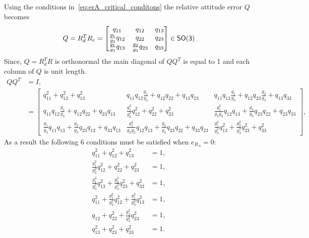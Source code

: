 Using the conditions in~\cref{eq:erA_critical_conditons} the relative attitude error \( Q \) becomes
\begin{align}\label{eq:relative_attitude_error}
    Q = R_d^T R_e =
    \begin{bmatrix} 
        q_{11} & q_{12} & q_{13} \\ 
        \frac{g_1}{g_2} q_{12} & q_{22} & q_{23} \\
        \frac{g_1}{g_3} q_{13} & \frac{g_2}{g_3} q_{23} & q_{33}
    \end{bmatrix}
    \in \mathsf{SO(3)}
\end{align}
Since, \( Q = R_d^T R \) is orthonormal the main diagonal of \( QQ^T \) is equal to \num{1} and each column of \( Q \) is unit length.
\begin{align*}
    Q Q^T &= I, \\
          &= \begin{bmatrix}
            q_{11}^2 + q_{12}^2 + q_{13}^2 & q_{11}q_{12}\frac{g_1}{g_2} + q_{12}q_{22} + q_{13}q_{23} & q_{11}q_{13}\frac{g_1}{g_3} + q_{12}q_{23}\frac{g_2}{g_3} + q_{13}q_{33} \\
            q_{11}q_{12}\frac{g_1}{g_2}  + q_{12}q_{22} + q_{23}q_{13} & \frac{g_1^2}{g_2^2}q_{12}^2 + q_{22}^2 + q_{23}^2 & \frac{g_1^2}{g_2g_3} q_{12}q_{13} + \frac{g_2}{g_3}q_{23}q_{22} + q_{23}q_{33} \\
            \frac{g_1}{g_3} q_{11}q_{13} + \frac{g_2}{g_3}q_{23}q_{12} + q_{33}q_{13} & \frac{g_1^2}{g_3 g_2} q_{12}q_{13} + \frac{g_2}{g_3} q_{23}q_{22} + q_{33} q_{23} & \frac{g_1^2}{g_3^2}q_{13}^2 + \frac{g_2^2}{g_3^2}q_{23}^2 + q_{33}^2
\end{bmatrix} , 
\end{align*}
As a result the following \num{6} conditions must be satisfied when \( e_{R_A} = 0 \):
\begin{align}
    q_{11}^2 + q_{12}^2 + q_{13}^2 &= 1,\label{eq:orthogonal_1} \\
    \frac{g_1^2}{g_2^2}q_{12}^2 + q_{22}^2 + q_{23}^2 &= 1, \label{eq:orthogonal_2}\\
    \frac{g_1^2}{g_3^2}q_{13}^2 + \frac{g_2^2}{g_3^2}q_{23}^2 + q_{33}^2 &= 1, \label{eq:orthogonal_3}\\
    q_{11}^2 + \frac{g_1^2}{g_2^2}q_{12}^2 + \frac{g_1^2}{g_3^2}q_{13}^2 &= 1, \label{eq:unit_norm_1}\\
    q_{12} + q_{22}^2 + \frac{g_2^2}{g_3^2}q_{23}^2 &= 1, \label{eq:unit_norm_2}\\
    q_{13}^2 + q_{23}^2 + q_{33}^2 &= 1.\label{eq:unit_norm_3}
\end{align}
